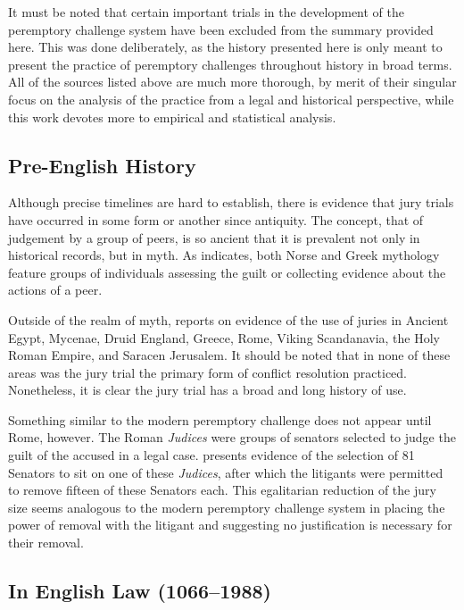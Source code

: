 It must be noted that certain important trials in the development of the peremptory challenge system have been excluded from the
summary provided here. This was done deliberately, as the history presented here is only meant to present the practice of
peremptory challenges throughout history in broad terms. All of the sources listed above are much more thorough, by merit of their
singular focus on the analysis of the practice from a legal and historical perspective, while this work devotes more to empirical
and statistical analysis.

\subsection{Pre-English History}

Although precise timelines are hard to establish, there is evidence that jury trials have occurred in some form or another since
antiquity. The concept, that of judgement by a group of peers, is so ancient that it is prevalent not only in historical records,
but in myth. As \cite{hoffman1997} indicates, both Norse and Greek mythology feature groups of individuals assessing the guilt or
collecting evidence about the actions of a peer.

Outside of the realm of myth, \cite{hoffman1997} reports on evidence of the use of juries in Ancient Egypt, Mycenae, Druid
England, Greece, Rome, Viking Scandanavia, the Holy Roman Empire, and Saracen Jerusalem. It should be noted that in none of these
areas was the jury trial the primary form of conflict resolution practiced. Nonetheless, it is clear the jury trial has a broad
and long history of use.

Something similar to the modern peremptory challenge does not appear until Rome, however. The Roman \textit{Judices} were groups
of senators selected to judge the guilt of the accused in a legal case. \cite{hoffman1997} presents evidence of the selection of
81 Senators to sit on one of these \textit{Judices}, after which the litigants were permitted to remove fifteen of these Senators
each. This egalitarian reduction of the jury size seems analogous to the modern peremptory challenge system in placing the power
of removal with the litigant and suggesting no justification is necessary for their removal.

\subsection{In English Law (1066--1988)}

